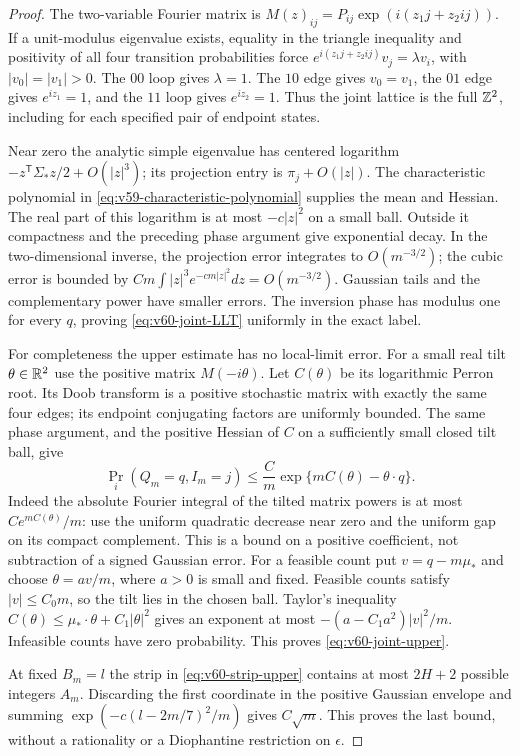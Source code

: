 \begin{proof}
The two-variable Fourier matrix is
$M(z)_{ij}=P_{ij}\exp(i(z_1j+z_2ij))$. If a unit-modulus eigenvalue
exists, equality in the triangle inequality and positivity of all four
transition probabilities force
$e^{i(z_1j+z_2ij)}v_j=\lambda v_i$, with $|v_0|=|v_1|>0$.
The $00$ loop gives $\lambda=1$. The $10$ edge gives $v_0=v_1$,
the $01$ edge gives $e^{iz_1}=1$, and the $11$ loop gives
$e^{iz_2}=1$. Thus the joint lattice is the full $\mathbb Z^2$, including
for each specified pair of endpoint states.

Near zero the analytic simple eigenvalue has centered logarithm
$-z^{\mathsf T}\Sigma_*z/2+O(|z|^3)$; its projection entry is
$\pi_j+O(|z|)$. The characteristic polynomial in
\eqref{eq:v59-characteristic-polynomial} supplies the mean and Hessian.
The real part of this logarithm is at most $-c|z|^2$ on a small ball.
Outside it compactness and the preceding phase argument give
exponential decay. In the two-dimensional inverse, the projection
error integrates to $O(m^{-3/2})$; the cubic error is bounded by
$Cm\int |z|^3e^{-cm|z|^2}dz=O(m^{-3/2})$.
Gaussian tails and the complementary power have smaller errors.
The inversion phase has modulus one for every $q$, proving
\eqref{eq:v60-joint-LLT} uniformly in the exact label.

For completeness the upper estimate has no local-limit error. For a
small real tilt $\theta\in\mathbb R^2$ use the positive matrix
$M(-i\theta)$. Let $C(\theta)$ be its logarithmic Perron root.
Its Doob transform is a positive stochastic matrix with exactly the
same four edges; its endpoint conjugating factors are uniformly
bounded. The same phase argument, and the positive Hessian of
$C$ on a sufficiently small closed tilt ball, give
\[
 \Pr_i(Q_m=q,I_m=j)
       \le \frac{C}{m}\exp\{mC(\theta)-\theta\cdot q\}.
\]
Indeed the absolute Fourier integral of the tilted matrix powers is
at most $C e^{mC(\theta)}/m$: use the uniform quadratic decrease near
zero and the uniform gap on its compact complement. This is a bound
on a positive coefficient, not subtraction of a signed Gaussian error.
For a feasible count put $v=q-m\mu_*$ and choose $\theta=a v/m$,
where $a>0$ is small and fixed. Feasible counts satisfy $|v|\le C_0m$,
so the tilt lies in the chosen ball. Taylor's inequality
$C(\theta)\le\mu_*\cdot\theta+C_1|\theta|^2$ gives an exponent at
most $-(a-C_1a^2)|v|^2/m$. Infeasible counts have zero probability.
This proves \eqref{eq:v60-joint-upper}.

At fixed $B_m=l$ the strip in \eqref{eq:v60-strip-upper} contains at
most $2H+2$ possible integers $A_m$. Discarding the first coordinate
in the positive Gaussian envelope and summing
$\exp(-c(l-2m/7)^2/m)$ gives $C\sqrt m$. This proves the last bound,
without a rationality or a Diophantine restriction on $\epsilon$.
\end{proof}

